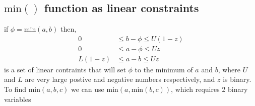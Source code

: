 \documentclass[a4paper]{article}
\begin{document}
\subsection{$\text{min}()$ function as linear constraints}

if $\phi = \text{min}\left( a,b \right) $ then,
\begin{align}
0 &\le b - \phi \le U(1- z) \\
0 &\le a - \phi \le Uz \\
L(1-z) &\le a - b \le Uz
\end{align}
is a set of linear contraints that will set $\phi$ to the minimum of $a$ and $b$, where $U$ and $L$ are very large postive and negative numbers respectively, and $z$ is binary.
%
To find $\text{min}(a,b,c)$ we can use $\text{min}(a,\text{min}(b,c))$, which requires 2 binary variables
\end{document}

